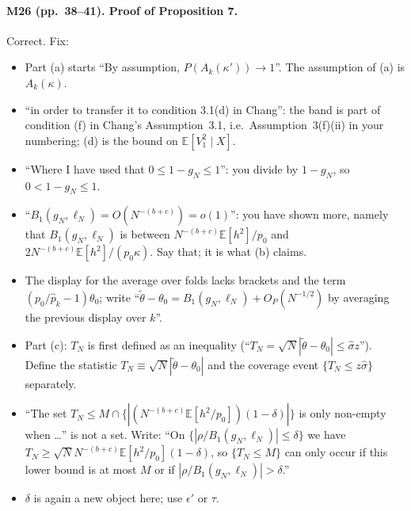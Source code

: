 \documentclass[11pt]{article}
\providecommand{\E}{\mathbb{E}}
\theoremstyle{plain}
\theoremstyle{remark}
\begin{document}
\paragraph{M26 (pp.~38--41). Proof of Proposition 7.} Correct. Fix:
\begin{itemize}
\item Part (a) starts ``By assumption, $P(A_k(\kappa'))\to1$''. The assumption of
  (a) is $A_k(\kappa)$.
\item ``in order to transfer it to condition 3.1(d) in Chang'': the band is
  part of condition (f) in Chang's Assumption~3.1, i.e.\ Assumption~3(f)(ii) in
  your numbering; (d) is the bound on $\E[V_1^2\mid X]$.
\item ``Where I have used that $0\le1-g_N\le1$'': you divide by $1-g_N$, so
  $0<1-g_N\le1$.
\item ``$B_1(g_N,\ell_N)=O(N^{-(b+c)})=o(1)$'': you have shown more, namely that
  $B_1(g_N,\ell_N)$ is between $N^{-(b+c)}\E[h^2]/p_0$ and
  $2N^{-(b+c)}\E[h^2]/(p_0\kappa)$. Say that; it is what (b) claims.
\item The display for the average over folds lacks brackets and the term
  $(p_0/\hat p_k-1)\theta_0$; write
  ``$\tilde\theta-\theta_0=B_1(g_N,\ell_N)+O_P(N^{-1/2})$ by averaging the
  previous display over $k$''.
\item Part (c): $T_N$ is first defined as an inequality (``$T_N=\sqrt N|\tilde\theta-\theta_0|\le\hat\sigma z$'').
  Define the statistic $T_N\equiv\sqrt N|\tilde\theta-\theta_0|$ and the coverage
  event $\{T_N\le z\hat\sigma\}$ separately.
\item ``The set $T_N\le M\cap\{|(N^{-(b+c)}\E[h^2/p_0])(1-\delta)|\}$ is only
  non-empty when \dots'' is not a set. Write: ``On
  $\{|\rho/B_1(g_N,\ell_N)|\le\delta\}$ we have
  $T_N\ge\sqrt N N^{-(b+c)}\E[h^2/p_0](1-\delta)$, so $\{T_N\le M\}$ can only
  occur if this lower bound is at most $M$ or if
  $|\rho/B_1(g_N,\ell_N)|>\delta$.''
\item $\delta$ is again a new object here; use $\epsilon'$ or $\tau$.
\end{itemize}
\end{document}

